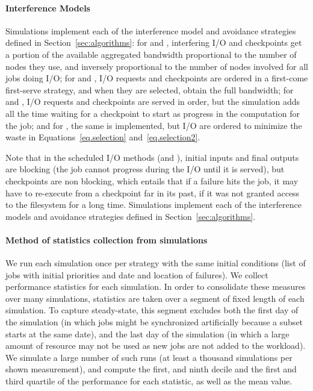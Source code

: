 \paragraph*{Interference Models} Simulations implement each of the
interference model and avoidance strategies defined in
Section~\ref{sec:algorithms}: for \propfixed and \propdaly,
interfering I/O and checkpoints get a portion of the available
aggregated bandwidth proportional to the number of nodes they use, and
inversely proportional to the number of nodes involved for all
jobs doing I/O; for \bfifofixed and \bfifodaly, I/O requests
and checkpoints are ordered in a first-come first-serve strategy, and
when they are selected, obtain the full bandwidth; for \fifofixed and
\fifodaly, I/O requests and checkpoints are served in order, but the
simulation adds all the time waiting for a checkpoint to start as
progress in the computation for the job; and for \cooperative,
the same is implemented, but I/O are ordered to minimize the waste in
Equations~\eqref{eq.selection} and~\eqref{eq.selection2}.


Note that in the scheduled I/O methods (\fifononblock and \cooperative),
initial inputs and final outputs are blocking (the job
cannot progress during the I/O until it is served), but checkpoints
are non blocking, which entails that if a failure hits the job,
it may have to re-execute from a checkpoint far in its past, if it was not
granted access to the filesystem for a long time.
\else
Simulations implement each of the interference models and avoidance
strategies defined in Section~\ref{sec:algorithms}.
\fi

\paragraph*{Method of statistics collection from simulations}
We run each simulation once per strategy with the same initial conditions (list of
jobs with initial priorities and date and location of failures).   We collect performance statistics for each simulation.  In
order to consolidate these measures over many simulations, statistics are taken over
a segment of fixed length of each simulation.   To capture steady-state, this segment excludes both
the first day of the simulation (in which jobs might be synchronized artificially
because a subset starts at the same date), and the last day of the simulation (in
which a large amount of resource may not be used as new jobs are not added to the
workload). We simulate a large number of such runs (at least a thousand simulations
per shown measurement), and compute the first, and ninth decile and the first and
third quartile of the performance for each statistic, as well as the mean value.
